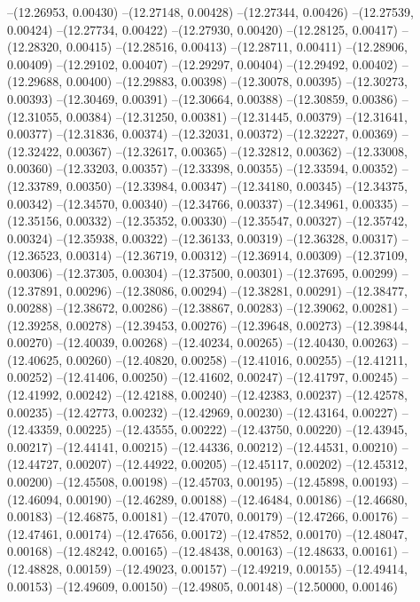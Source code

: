 --(12.26953, 0.00430)
--(12.27148, 0.00428)
--(12.27344, 0.00426)
--(12.27539, 0.00424)
--(12.27734, 0.00422)
--(12.27930, 0.00420)
--(12.28125, 0.00417)
--(12.28320, 0.00415)
--(12.28516, 0.00413)
--(12.28711, 0.00411)
--(12.28906, 0.00409)
--(12.29102, 0.00407)
--(12.29297, 0.00404)
--(12.29492, 0.00402)
--(12.29688, 0.00400)
--(12.29883, 0.00398)
--(12.30078, 0.00395)
--(12.30273, 0.00393)
--(12.30469, 0.00391)
--(12.30664, 0.00388)
--(12.30859, 0.00386)
--(12.31055, 0.00384)
--(12.31250, 0.00381)
--(12.31445, 0.00379)
--(12.31641, 0.00377)
--(12.31836, 0.00374)
--(12.32031, 0.00372)
--(12.32227, 0.00369)
--(12.32422, 0.00367)
--(12.32617, 0.00365)
--(12.32812, 0.00362)
--(12.33008, 0.00360)
--(12.33203, 0.00357)
--(12.33398, 0.00355)
--(12.33594, 0.00352)
--(12.33789, 0.00350)
--(12.33984, 0.00347)
--(12.34180, 0.00345)
--(12.34375, 0.00342)
--(12.34570, 0.00340)
--(12.34766, 0.00337)
--(12.34961, 0.00335)
--(12.35156, 0.00332)
--(12.35352, 0.00330)
--(12.35547, 0.00327)
--(12.35742, 0.00324)
--(12.35938, 0.00322)
--(12.36133, 0.00319)
--(12.36328, 0.00317)
--(12.36523, 0.00314)
--(12.36719, 0.00312)
--(12.36914, 0.00309)
--(12.37109, 0.00306)
--(12.37305, 0.00304)
--(12.37500, 0.00301)
--(12.37695, 0.00299)
--(12.37891, 0.00296)
--(12.38086, 0.00294)
--(12.38281, 0.00291)
--(12.38477, 0.00288)
--(12.38672, 0.00286)
--(12.38867, 0.00283)
--(12.39062, 0.00281)
--(12.39258, 0.00278)
--(12.39453, 0.00276)
--(12.39648, 0.00273)
--(12.39844, 0.00270)
--(12.40039, 0.00268)
--(12.40234, 0.00265)
--(12.40430, 0.00263)
--(12.40625, 0.00260)
--(12.40820, 0.00258)
--(12.41016, 0.00255)
--(12.41211, 0.00252)
--(12.41406, 0.00250)
--(12.41602, 0.00247)
--(12.41797, 0.00245)
--(12.41992, 0.00242)
--(12.42188, 0.00240)
--(12.42383, 0.00237)
--(12.42578, 0.00235)
--(12.42773, 0.00232)
--(12.42969, 0.00230)
--(12.43164, 0.00227)
--(12.43359, 0.00225)
--(12.43555, 0.00222)
--(12.43750, 0.00220)
--(12.43945, 0.00217)
--(12.44141, 0.00215)
--(12.44336, 0.00212)
--(12.44531, 0.00210)
--(12.44727, 0.00207)
--(12.44922, 0.00205)
--(12.45117, 0.00202)
--(12.45312, 0.00200)
--(12.45508, 0.00198)
--(12.45703, 0.00195)
--(12.45898, 0.00193)
--(12.46094, 0.00190)
--(12.46289, 0.00188)
--(12.46484, 0.00186)
--(12.46680, 0.00183)
--(12.46875, 0.00181)
--(12.47070, 0.00179)
--(12.47266, 0.00176)
--(12.47461, 0.00174)
--(12.47656, 0.00172)
--(12.47852, 0.00170)
--(12.48047, 0.00168)
--(12.48242, 0.00165)
--(12.48438, 0.00163)
--(12.48633, 0.00161)
--(12.48828, 0.00159)
--(12.49023, 0.00157)
--(12.49219, 0.00155)
--(12.49414, 0.00153)
--(12.49609, 0.00150)
--(12.49805, 0.00148)
--(12.50000, 0.00146)
